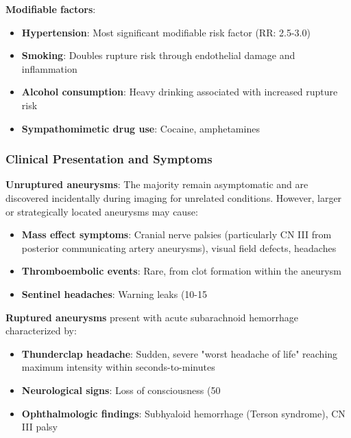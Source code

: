 \documentclass[conference]{IEEEtran}
\begin{document}
\textbf{Modifiable factors}:
\begin{itemize}
    \item \textbf{Hypertension}: Most significant modifiable risk factor (RR: 2.5-3.0)
    \item \textbf{Smoking}: Doubles rupture risk through endothelial damage and inflammation
    \item \textbf{Alcohol consumption}: Heavy drinking associated with increased rupture risk
    \item \textbf{Sympathomimetic drug use}: Cocaine, amphetamines
\end{itemize}

\subsubsection{Clinical Presentation and Symptoms}

\textbf{Unruptured aneurysms}: The majority remain asymptomatic and are discovered incidentally during imaging for unrelated conditions. However, larger or strategically located aneurysms may cause:
\begin{itemize}
    \item \textbf{Mass effect symptoms}: Cranial nerve palsies (particularly CN III from posterior communicating artery aneurysms), visual field defects, headaches
    \item \textbf{Thromboembolic events}: Rare, from clot formation within the aneurysm
    \item \textbf{Sentinel headaches}: Warning leaks (10-15\\%
\end{itemize}

\textbf{Ruptured aneurysms} present with acute subarachnoid hemorrhage characterized by:
\begin{itemize}
    \item \textbf{Thunderclap headache}: Sudden, severe "worst headache of life" reaching maximum intensity within seconds-to-minutes
    \item \textbf{Neurological signs}: Loss of consciousness (50\\%
    \item \textbf{Ophthalmologic findings}: Subhyaloid hemorrhage (Terson syndrome), CN III palsy
\end{itemize}
\end{document}
